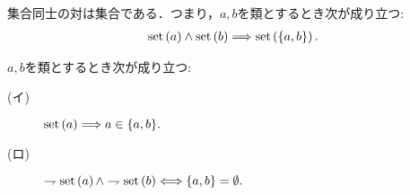 	\begin{screen}
		\begin{axm}[対の公理]
			集合同士の対は集合である．つまり，$a,b$を類とするとき次が成り立つ:
			\begin{align}
				\operatorname*{set} \left(a\right) \wedge \operatorname*{set} \left(b\right) \Longrightarrow 
				\operatorname*{set} \left(\{a,b\}\right).
			\end{align}
		\end{axm}
	\end{screen}
	
	\begin{screen}
		\begin{thm}[真類の対は空]
		\label{thm:pair_of_proper_classes_is_emptyset}
			$a,b$を類とするとき次が成り立つ:
			\begin{description}
				\item[(イ)] $\operatorname*{set} \left(a\right) \Longrightarrow a \in \{a,b\}.$
				
				\item[(ロ)] $\rightharpoondown \operatorname*{set} \left(a\right) \wedge \rightharpoondown \operatorname*{set} \left(b\right) \Longleftrightarrow \{a,b\} = \emptyset.$
			\end{description}
		\end{thm}
	\end{screen}
	
